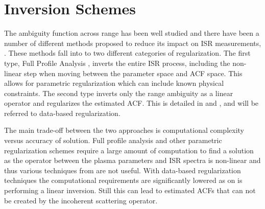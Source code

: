 \section{Inversion Schemes}
\label{sec:isrlit}
The ambiguity function across range has been well studied and there have been a number of different methods proposed to reduce its impact on ISR measurements,
\citep{RDS:RDS3308,hysell2008,nikoukar2008,Virtanen:20082vx}. These methods fall into to two different categories of regularization. The first type, Full Profile Analysis \citep{RDS:RDS3308,hysell2008}, inverts the entire ISR process, including the non-linear step when moving between the parameter space and ACF space. This allows for parametric regularization which can include known physical constraints. The second type inverts only the range ambiguity as a linear operator and regularizes the estimated ACF. This is detailed in \citet{nikoukar2008} and \citet{Virtanen:20082vx}, and will be referred to data-based regularization.

The main trade-off between the two approaches is computational complexity versus accuracy of solution. Full profile analysis and other parametric regularization schemes require a large amount of computation to find a solution as the operator between the plasma parameters and ISR spectra is non-linear and thus various techniques from are not useful. With data-based regularization techniques the computational requirements are significantly lowered as on is performing a linear inversion. Still this can lead to estimated ACFs that can not be created by the incoherent scattering operator.

%
%


